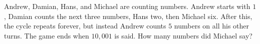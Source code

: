 Andrew, Damian, Hans, and Michael are counting numbers. Andrew starts with $1$, Damian counts the next three numbers, Hans two, then Michael six. After this, the cycle repeats forever, but instead Andrew counts $5$ numbers on all his other turns. The game ends when $10,001$ is said. How many numbers did Michael say?
